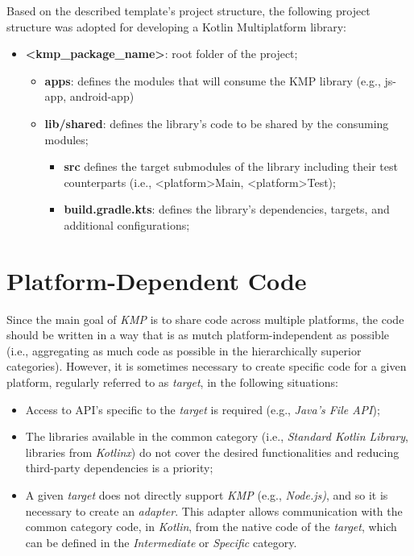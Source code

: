 Based on the described template's project structure, the following project structure was adopted for developing a Kotlin Multiplatform library:

\begin{itemize}
    \item \textbf{\textless kmp\_package\_name\textgreater}: root folder of the project;
    \begin{itemize}
        \item \textbf{apps}: defines the modules that will consume the KMP library (e.g., js-app, android-app)
        \item \textbf{lib/shared}: defines the library's code to be shared by the consuming modules;
        \begin{itemize}
            \item \textbf{src} defines the target submodules of the library including their test counterparts (i.e., <platform>Main, <platform>Test);
            \item \textbf{build.gradle.kts}: defines the library's dependencies, targets, and additional configurations;
        \end{itemize}
    \end{itemize}
\end{itemize}


\section{Platform-Dependent Code}\label{sec:platform-dependent-code}

Since the main goal of \textit{KMP} is to share code across multiple platforms, the code should be written in a way that is as mutch platform-independent as possible (i.e., aggregating as much code as possible in the hierarchically superior categories).
However, it is sometimes necessary to create specific code for a given platform, regularly referred to as \textit{target}, in the following situations:

\begin{itemize}
    \item Access to API's specific to the \textit{target} is required (e.g., \textit{Java's File API});
    \item The libraries available in the common category (i.e., \textit{Standard Kotlin Library}, libraries from \textit{Kotlinx}) do not cover the desired functionalities and reducing third-party dependencies is a priority;
    \item A given \textit{target} does not directly support \textit{KMP} (e.g., \textit{Node.js)}, and so it is necessary to create an \textit{adapter}.
    This adapter allows communication with the common category code, in \textit{Kotlin}, from the native code of the \textit{target}, which can be defined in the \textit{Intermediate} or \textit{Specific} category.
\end{itemize}

